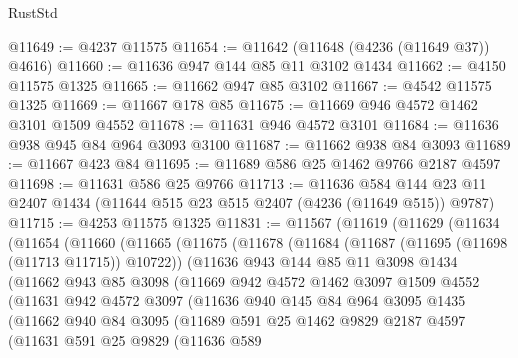 \begin{lexlean}{RustStd}
\begin{coremodule}
@11649 := @4237 @11575
@11654 := @11642 (@11648 (@4236 (@11649 @37)) @4616)
@11660 := @11636 @947 @144 @85 @11 @3102 @1434
@11662 := @4150 @11575 @1325
@11665 := @11662 @947 @85 @3102
@11667 := @4542 @11575 @1325
@11669 := @11667 @178 @85
@11675 := @11669 @946 @4572 @1462 @3101 @1509 @4552
@11678 := @11631 @946 @4572 @3101
@11684 := @11636 @938 @945 @84 @964 @3093 @3100
@11687 := @11662 @938 @84 @3093
@11689 := @11667 @423 @84
@11695 := @11689 @586 @25 @1462 @9766 @2187 @4597
@11698 := @11631 @586 @25 @9766
@11713 := @11636
    @584
    @144
    @23
    @11
    @2407
    @1434
    (@11644 @515 @23 @515 @2407 (@4236 (@11649 @515)) @9787)
@11715 := @4253 @11575 @1325
@11831 := @11567
    (@11619
      (@11629
        (@11634
          (@11654
            (@11660
              (@11665
                (@11675
                  (@11678
                    (@11684
                      (@11687 (@11695 (@11698 (@11713 @11715)) @10722))
                      (@11636
                        @943
                        @144
                        @85
                        @11
                        @3098
                        @1434
                        (@11662
                          @943
                          @85
                          @3098
                          (@11669
                            @942
                            @4572
                            @1462
                            @3097
                            @1509
                            @4552
                            (@11631
                              @942
                              @4572
                              @3097
                              (@11636
                                @940
                                @145
                                @84
                                @964
                                @3095
                                @1435
                                (@11662
                                  @940
                                  @84
                                  @3095
                                  (@11689
                                    @591
                                    @25
                                    @1462
                                    @9829
                                    @2187
                                    @4597
                                    (@11631
                                      @591
                                      @25
                                      @9829
                                      (@11636
                                        @589

\end{coremodule}
\end{lexlean}
